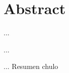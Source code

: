 %
%
%
%
%

\chapter{Abstract}

\begin{FraseCelebre}
\begin{Frase}
...
\end{Frase}
\begin{Fuente}
...
\end{Fuente}
\end{FraseCelebre}

... Resumen chulo

\endinput
